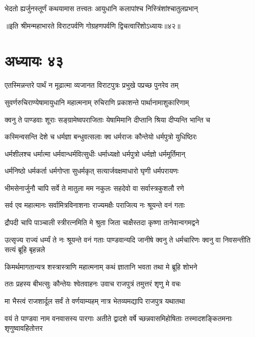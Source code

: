 \twolineshloka
{भेदतो ह्यर्जुनस्तूर्णं कथयामास तत्त्वतः}
{आयुधानि कलापांश्च निस्त्रिंशांश्चातुलप्रभान्}

॥इति श्रीमन्महाभारते विराटपर्वणि गोग्रहणपर्वणि द्विचत्वारिंशोऽध्यायः॥४२॥

\chapter{अध्यायः ४३}

\twolineshloka
{एतस्मिन्नन्तरे पार्थं न मूढात्मा व्यजानत}
{विराटपुत्रः प्रभुखे पप्रच्छ पुनरेव तम्}


\twolineshloka
{सुवर्णरुचिराण्येषामायुधानि महात्मनाम्}
{रुचिराणि प्रकाशन्ते पार्थानामाशुकारिणाम्}


\twolineshloka
{क्वनु ते पाण्डवाः शूराः सङ्ग्रामेष्वपराजिताः}
{येषामिमानि दीप्तानि श्रिया दीप्यन्ति भान्ति च}



\twolineshloka
{कस्मिन्वसन्ति देशे च धर्मज्ञा बन्धुवत्सलाः}
{क्व धर्मराजः कौन्तेयो धर्मपुत्रो युधिष्ठिरः}


\twolineshloka
{धर्मशीलश्च धर्मात्मा धर्मवान्धर्मवित्सुधीः}
{धर्माध्यक्षो धर्मपुत्रो धर्मज्ञो धर्ममूर्तिमान्}


\twolineshloka
{धर्मनिष्ठो धर्मकर्ता धर्मगोप्ता सुधर्मकृत्}
{सत्यार्जवक्षमाधारो घृणी धर्मपरायणः}


\twolineshloka
{भीमसेनार्जुनौ चापि सर्वे ते मातुला मम}
{नकुलः सहदेवो वा सर्वास्त्रकुशलौ रणे}


\twolineshloka
{सर्व एव महात्मानः सर्वामित्रविनाशनाः}
{राज्यमक्षैः पराजित्य नः श्रूयन्ते वनं गताः}


\twolineshloka
{द्रौपदी चापि पाञ्चाली स्त्रीरत्नमिति मे श्रुता}
{जिता चाक्षैस्तदा कृष्णा तानेवान्वगमद्वने}


\onelineshloka
{उत्सृज्य राज्यं धर्म्यं ते नः श्रूयन्ते वनं गताः}
\twolineshloka
{पाण्डवान्यदि जानीषे क्वनु ते धर्मचारिणः}
{क्वनु वा निवसन्तीति सत्यं ब्रूहि बृहन्नले}


\twolineshloka
{किमर्थमागतान्यत्र शस्त्रास्त्राणि महात्मनाम्}
{कथं ज्ञातानि भवता तथा मे ब्रूहि शोभने}



\twolineshloka
{ततः प्रहस्य बीभत्सुः कौन्तेयः श्वेतवाहनः}
{उवाच राजपुत्रं तमुत्तरं शृणु मे वचः}


\twolineshloka
{मा भैस्त्वं राजशार्दूल सर्वं ते वर्णयाम्यहम्}
{नात्र भेतव्यमद्यापि राजपुत्र यथातथा}


\threelineshloka
{वयं ते पाण्डवा नाम वनवासस्य पारगाः}
{अतीते द्वादशे वर्षे च्छन्नवासमिहोषिताः}
{तस्मादशङ्कितमनाः शृणुष्वावहितोत्तर}


